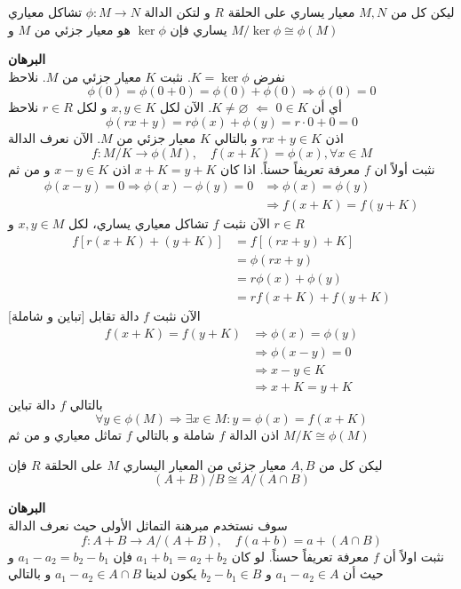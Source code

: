 \begin{theorem}
		ليكن كل من $M,N$ معيار يساري على الحلقة $R$ و لتكن الدالة $\phi:M\to N$ تشاكل معياري يساري فإن $\ker \phi$ هو معيار جزئي من $M$ و $M/\ker\phi\cong \phi(M)$
\end{theorem}
\noindent
\textbf{البرهان}\\
\noindent
نفرض $K=\ker\phi$. نثبت $K$ معيار جزئي من $M$. نلاحظ
\[
\phi(0) = \phi(0+0) = \phi(0) + \phi(0) \Rightarrow \phi(0) = 0
\]
أي أن $0\in K$ $\Leftarrow$ $K\neq \varnothing$. الآن لكل $x,y\in K$ و لكل $r\in R$ نلاحظ
\[
\phi(rx+y) = r\phi(x) + \phi(y) = r\cdot 0 + 0 =0 
\]
اذن $rx+y\in K$ و بالتالي $K$ معيار جزئي من $M$. الآن نعرف الدالة
\[
f:M/K \to \phi(M), \quad f(x+K) = \phi(x), \forall x\in M
\]
نثبت أولاً ان $f$ معرفة تعريفاً حسناً. اذا كان $x+K=y+K$ اذن $x-y\in K$ و من ثم
\begin{align*}
	\phi(x-y) = 0 \Rightarrow \phi(x) - \phi(y) = 0 &\Rightarrow \phi(x) = \phi(y)\\
	&\Rightarrow f(x+K) = f(y+K)
\end{align*}
الآن نثبت $f$ تشاكل معياري يساري، لكل $x,y\in M$ و $r\in R$
\begin{align*}
	f[r(x+K) + (y+K)] &= f[(rx+y) + K] \\
	&= \phi(rx+y)\\
	&= r\phi(x) + \phi(y)\\
	&= rf(x+K) + f(y+K)
\end{align*}
الآن نثبت $f$ دالة تقابل [تباين و شاملة]
\begin{align*}
	f(x+K) = f(y+K) &\Rightarrow \phi(x) = \phi(y)\\
	&\Rightarrow \phi(x-y) = 0\\
	&\Rightarrow x-y \in K\\
	&\Rightarrow x+K = y+K
\end{align*}
بالتالي $f$ دالة تباين 
\[
\forall y\in \phi(M) \Rightarrow \exists x\in M: y = \phi(x) = f(x+K)
\]
اذن الدالة $f$ شاملة و بالتالي $f$ تماثل معياري و من ثم $M/K\cong\phi(M)$
\begin{theorem}
	ليكن كل من $A,B$ معيار جزئي من المعيار اليساري $M$ على  الحلقة $R$ فإن
\[
(A+B)/B\cong A/(A\cap B)
\]
\end{theorem}
\noindent
\textbf{البرهان}\\
\noindent
سوف نستخدم مبرهنة التماثل الأولى حيث نعرف الدالة
\[
f:A+B \to A/(A+B), \quad f(a+b) = a+(A\cap B)
\]
نثبت اولاً أن $f$ معرفة تعريفاً حسناً. لو كان $a_1+b_1=a_2+b_2$ فإن $a_1-a_2=b_2-b_1$ و حيث أن $a_1-a_2\in A$ و $b_2-b_1\in B$ يكون لدينا $a_1-a_2\in A\cap B$ و بالتالي
